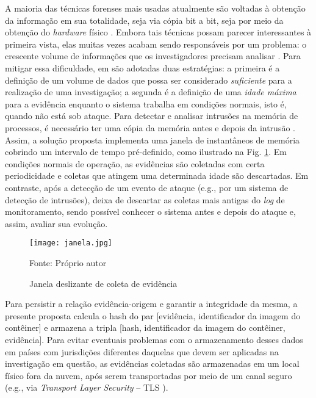 A maioria das técnicas forenses mais usadas atualmente são voltadas à obtenção da informação em sua totalidade, seja via cópia bit a bit, seja por meio da obtenção do \textit{hardware} físico \cite{SimouCloudChlng:2014} \cite{BemPastPresentFuture:2008}. 
%
Embora tais técnicas possam parecer interessantes à primeira vista, elas muitas vezes acabam sendo responsáveis por um problema: o crescente volume de informações que os investigadores precisam analisar \cite{QuickIncreaseVolumeImpact:2014}.
%
Para mitigar essa dificuldade, em \fancyname são adotadas duas estratégias: a primeira é a definição de um volume de dados que possa ser considerado \textit{suficiente} para a realização de uma investigação; a segunda é a definição de uma \textit{idade máxima} para a evidência enquanto o sistema trabalha em condições normais, isto é, quando não está sob ataque.
%
Para detectar e analisar intrusões na memória de processos, é necessário ter uma cópia da memória antes e depois da intrusão \cite{CaseMemoryForensics:2014}. 
%
Assim, a solução proposta implementa uma janela de instantâneos de memória cobrindo um intervalo de tempo pré-definido, como ilustrado na Fig. \ref{fig:janela}. 
%
Em condições normais de operação, as evidências são coletadas com certa periodicidade e coletas que atingem uma determinada idade são descartadas.
%
Em contraste, após a detecção de um evento de ataque (e.g., por um sistema de detecção de intrusões), \fancyname deixa de descartar as coletas mais antigas do \textit{log} de monitoramento, sendo possível conhecer o sistema antes e depois do ataque e, assim, avaliar sua evolução.
%
%

\begin{figure}[htb!]
\footnotesize
\caption{Janela deslizante de coleta de evidência}
\texttt{[image: janela.jpg]}
\centering
\label{fig:janela}
\begin{center}
Fonte: Próprio autor 
\end{center}
\end{figure}

Para persistir a relação evidência-origem e garantir a integridade da mesma, a presente proposta calcula o hash do par [evidência, identificador da imagem do contêiner] e armazena a tripla [hash, identificador da imagem do contêiner, evidência].
%
Para evitar eventuais problemas com o armazenamento desses dados em países com jurisdições diferentes daquelas que devem ser aplicadas na investigação em questão, as evidências coletadas são armazenadas em um local físico fora da nuvem, após serem transportadas por meio de um canal seguro (e.g., via \textit{Transport Layer Security} -- TLS \cite{DierksT2008}).
%

